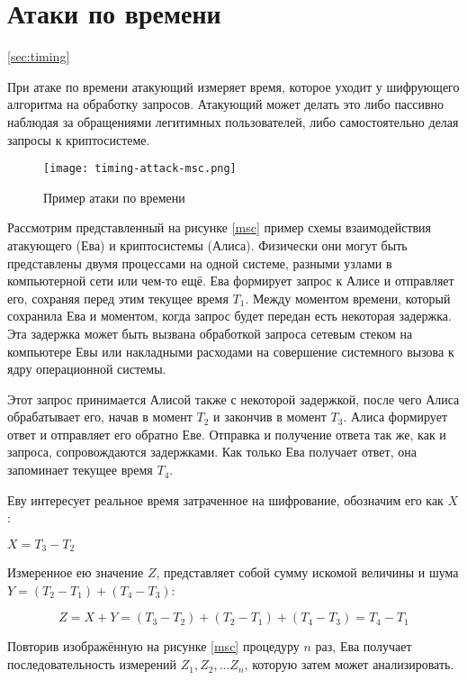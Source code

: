 \section{Атаки по времени} \ref{sec:timing}

При атаке по времени атакующий измеряет время, которое уходит у шифрующего
алгоритма на обработку запросов. Атакующий может делать это либо пассивно
наблюдая за обращениями легитимных пользователей, либо самостоятельно делая
запросы к криптосистеме.

\begin{figure}[h]
    \centering
    \texttt{[image: timing-attack-msc.png]}
    \caption{Пример атаки по времени}
\end{figure} \label{fig:msc}

Рассмотрим представленный на рисунке \ref{msc} пример схемы взаимодействия атакующего (Ева)
и криптосистемы (Алиса). Физически они могут быть представлены двумя процессами на одной
системе, разными узлами в компьютерной сети или чем-то ещё. Ева формирует запрос
к Алисе и отправляет его, сохраняя перед этим текущее время $T_1$. Между
моментом времени, который сохранила Ева и моментом, когда запрос будет передан
есть некоторая задержка. Эта задержка может быть вызвана обработкой запроса
сетевым стеком на компьютере Евы или накладными расходами на совершение системного
вызова к ядру операционной системы. 

Этот запрос принимается Алисой также с некоторой задержкой, после чего Алиса
обрабатывает его, начав в момент $T_2$ и закончив в момент $T_3$. Алиса
формирует ответ и отправляет его обратно Еве. Отправка и получение ответа так же,
как и запроса, сопровождаются задержками. Как только Ева получает ответ, она
запоминает текущее время $T_4$.

Еву интересует реальное время затраченное на шифрование, обозначим его как $X$ :

$X = T_3 - T_2$

Измеренное ею значение $Z$, представляет собой сумму искомой величины и шума
$Y = (T_2 - T_1) + (T_4 - T_3)$:

\begin{equation}
Z = X + Y = (T_3 - T_2) + (T_2 - T_1) + (T_4 - T_3) = T_4 - T_1
\end{equation} \label{eq:noise}

Повторив изображённую на рисунке \ref{msc} процедуру $n$ раз, Ева получает
последовательность измерений ${Z_1, Z_2, ... Z_n}$, которую затем может анализировать.

